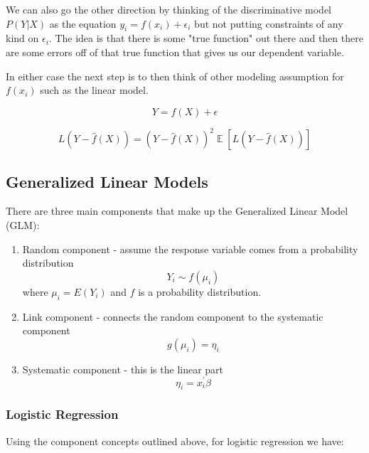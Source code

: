 \documentclass[paper=a4, fontsize=11pt]{scrartcl} %
\numberwithin{equation}{section} %
\numberwithin{figure}{section} %
\numberwithin{table}{section} %
\DeclareMathOperator{\EX}{\mathbb{E}}%
\begin{document}
We can also go the other direction by thinking of the discriminative model $P(Y|X)$ as the equation $y_i = f(x_i) + \epsilon_i$ but not putting constraints of any kind on $\epsilon_i$. The idea is that there is some "true function" out there and then there are some errors off of that true function that gives us our dependent variable.

In either case the next step is to then think of other modeling assumption for $f(x_i)$ such as the linear model.

\begin{equation}
Y = f(X) + \epsilon
\end{equation}


\begin{equation}
L(Y - \hat{f}(X)) = (Y - \hat{f}(X))^2
\EX[L(Y - \hat{f}(X))]
\end{equation}


\subsection{Generalized Linear Models}

There are three main components that make up the Generalized Linear Model (GLM):

\begin{enumerate}
\item Random component - assume the response variable comes from a probability distribution
\begin{equation}
Y_i \sim f(\mu_i)
\end{equation}
where $\mu_i = E(Y_i)$ and $f$ is a probability distribution.
\item Link component - connects the random component to the systematic component
\begin{equation}
g(\mu_i)=\eta_i
\end{equation}
\item Systematic component - this is the linear part
\begin{equation}
\eta_i = x_i^\prime \beta
\end{equation}

\end{enumerate}


\subsubsection{Logistic Regression}

Using the component concepts outlined above, for logistic regression we have:
\end{document}
